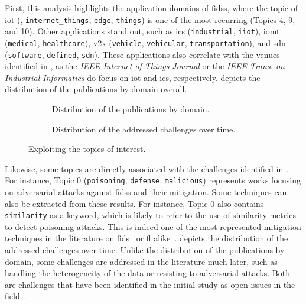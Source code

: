 First, this analysis highlights the application domains of \glspl{fids}, where the topic of \gls{iot} (\ie, \texttt{internet\_things}, \texttt{edge}, \texttt{things}) is one of the most recurring (Topics 4, 9, and 10).
Other applications stand out, such as \gls{ics} (\texttt{industrial}, \texttt{iiot}), \gls{iomt} (\texttt{medical}, \texttt{healthcare}), \gls{v2x} (\texttt{vehicle}, \texttt{vehicular}, \texttt{transportation}), and \gls{sdn} (\texttt{software}, \texttt{defined}, \texttt{sdn}).
These applications also correlate with the venues identified in , as the \emph{IEEE Internet of Things Journal} or the \emph{IEEE Trans. on Industrial Informatics} do focus on \gls{iot} and \gls{ics}, respectively.
 depicts the distribution of the publications by domain overall.

\begin{figure}
  \centering
  \begin{subfigure}{0.48\textwidth}
    \centering
    
    \caption{
      Distribution of the publications by domain.
      \label{fig:sota.domains}
    }
  \end{subfigure}
  \hfill
  \begin{subfigure}{0.48\textwidth}
    \centering
    
    \caption{
      Distribution of the addressed challenges over time.
      \label{fig:sota.challenges}
    }
  \end{subfigure}
  
  \caption{
    Exploiting the topics of interest.
    \label{fig:sota.challenges-domains}
  }
\end{figure}

Likewise, some topics are directly associated with the challenges identified in .
For instance, Topic 0 (\texttt{poisoning}, \texttt{defense}, \texttt{malicious}) represents works focusing on adversarial attacks against \glspl{fids} and their mitigation. 
Some techniques can also be extracted from these results.
For instance, Topic 0 also contains \texttt{similarity} as a keyword, which is likely to refer to the use of similarity metrics to detect poisoning attacks.
This is indeed one of the most represented mitigation techniques in the literature on \gls{fids}~\cite{yang_Dependablefederatedlearning_2023} or \gls{fl} alike~\cite{fung_LimitationsFederatedLearning_2020,nguyen_FLAMETamingBackdoors_2022}.
 depicts the distribution of the addressed challenges over time.
Unlike the distribution of the publications by domain, some challenges are addressed in the literature much later, such as handling the heterogeneity of the data or resisting to adversarial attacks.
Both are challenges that have been identified in the initial study as open issues in the field~\cite{lavaur_tnsm_2022,lavaur_Federatedlearningenabler_2022}.